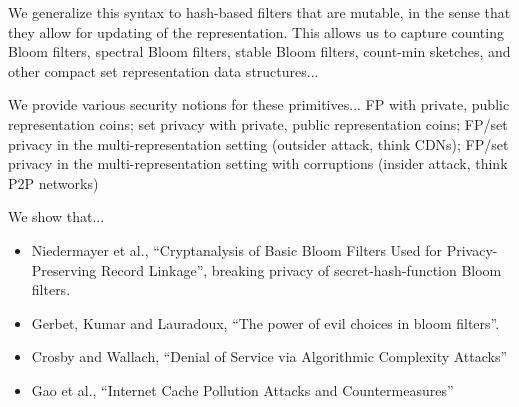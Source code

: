 We generalize this syntax to hash-based filters that are mutable,
%
in the sense
that they allow for updating of the representation. This allows us
to capture counting Bloom filters, spectral Bloom filters, stable
Bloom filters, count-min sketches, and other compact set
representation data structures...

We provide various security notions for these primitives... FP with private, public representation coins; set privacy with private, public representation coins; FP/set privacy in the multi-representation setting (outsider attack, think CDNs); FP/set privacy in the multi-representation setting with corruptions (insider attack, think P2P networks) 


We show that...

\begin{itemize}
\item Niedermayer et al., ``Cryptanalysis of Basic Bloom Filters Used for Privacy-Preserving Record Linkage'', breaking privacy of secret-hash-function Bloom filters. 
\item Gerbet, Kumar and Lauradoux, ``The power of evil choices in bloom filters''.  
\item Crosby and Wallach, ``Denial of Service via Algorithmic Complexity Attacks'' 
\item Gao et al., ``Internet Cache Pollution Attacks and Countermeasures''
\end{itemize}

